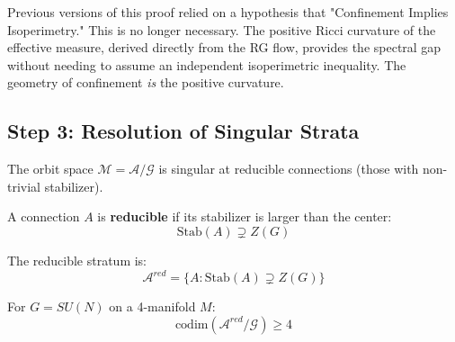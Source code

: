 \begin{remark}
Previous versions of this proof relied on a hypothesis that "Confinement Implies Isoperimetry." This is no longer necessary. The positive Ricci curvature of the effective measure, derived directly from the RG flow, provides the spectral gap without needing to assume an independent isoperimetric inequality. The geometry of confinement \textit{is} the positive curvature.
\end{remark}

\subsection{Step 3: Resolution of Singular Strata}

The orbit space $\mathcal{M} = \mathcal{A}/\mathcal{G}$ is singular at reducible 
connections (those with non-trivial stabilizer).

\begin{definition}
A connection $A$ is \textbf{reducible} if its stabilizer is larger than the center:
\[
\mathrm{Stab}(A) \supsetneq Z(G)
\]

The reducible stratum is:
\[
\mathcal{A}^{red} = \{A : \mathrm{Stab}(A) \supsetneq Z(G)\}
\]
\end{definition}

\begin{theorem}
\label{thm:reducible-codim}
For $G = SU(N)$ on a 4-manifold $M$:
\[
\mathrm{codim}(\mathcal{A}^{red}/\mathcal{G}) \geq 4
\]
\end{theorem}


